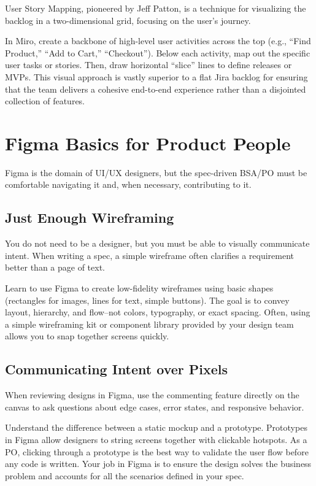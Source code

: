 \documentclass[
  11pt,
  openany,
  oneside]{book}
\begin{document}
User Story Mapping, pioneered by Jeff Patton, is a technique for
visualizing the backlog in a two-dimensional grid, focusing on the
user's journey.

In Miro, create a backbone of high-level user activities across the top
(e.g., ``Find Product,'' ``Add to Cart,'' ``Checkout''). Below each
activity, map out the specific user tasks or stories. Then, draw
horizontal ``slice'' lines to define releases or MVPs. This visual
approach is vastly superior to a flat Jira backlog for ensuring that the
team delivers a cohesive end-to-end experience rather than a disjointed
collection of features.

\section{Figma Basics for Product
People}\label{figma-basics-for-product-people}

Figma is the domain of UI/UX designers, but the spec-driven BSA/PO must
be comfortable navigating it and, when necessary, contributing to it.

\subsection{Just Enough Wireframing}\label{just-enough-wireframing}

You do not need to be a designer, but you must be able to visually
communicate intent. When writing a spec, a simple wireframe often
clarifies a requirement better than a page of text.

Learn to use Figma to create low-fidelity wireframes using basic shapes
(rectangles for images, lines for text, simple buttons). The goal is to
convey layout, hierarchy, and flow--not colors, typography, or exact
spacing. Often, using a simple wireframing kit or component library
provided by your design team allows you to snap together screens
quickly.

\subsection{Communicating Intent over
Pixels}\label{communicating-intent-over-pixels}

When reviewing designs in Figma, use the commenting feature directly on
the canvas to ask questions about edge cases, error states, and
responsive behavior.

Understand the difference between a static mockup and a prototype.
Prototypes in Figma allow designers to string screens together with
clickable hotspots. As a PO, clicking through a prototype is the best
way to validate the user flow before any code is written. Your job in
Figma is to ensure the design solves the business problem and accounts
for all the scenarios defined in your spec.
\end{document}
